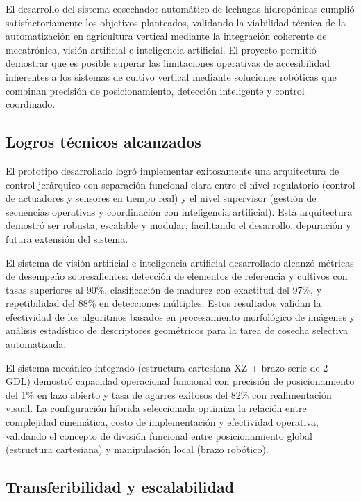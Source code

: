 El desarrollo del sistema cosechador automático de lechugas hidropónicas cumplió satisfactoriamente los objetivos planteados, validando la viabilidad técnica de la automatización en agricultura vertical mediante la integración coherente de mecatrónica, visión artificial e inteligencia artificial. El proyecto permitió demostrar que es posible superar las limitaciones operativas de accesibilidad inherentes a los sistemas de cultivo vertical mediante soluciones robóticas que combinan precisión de posicionamiento, detección inteligente y control coordinado.

\subsection*{Logros técnicos alcanzados}

El prototipo desarrollado logró implementar exitosamente una arquitectura de control jerárquico con separación funcional clara entre el nivel regulatorio (control de actuadores y sensores en tiempo real) y el nivel supervisor (gestión de secuencias operativas y coordinación con inteligencia artificial). Esta arquitectura demostró ser robusta, escalable y modular, facilitando el desarrollo, depuración y futura extensión del sistema.

El sistema de visión artificial e inteligencia artificial desarrollado alcanzó métricas de desempeño sobresalientes: detección de elementos de referencia y cultivos con tasas superiores al 90\%, clasificación de madurez con exactitud del 97\%, y repetibilidad del 88\% en detecciones múltiples. Estos resultados validan la efectividad de los algoritmos basados en procesamiento morfológico de imágenes y análisis estadístico de descriptores geométricos para la tarea de cosecha selectiva automatizada.

El sistema mecánico integrado (estructura cartesiana XZ + brazo serie de 2 GDL) demostró capacidad operacional funcional con precisión de posicionamiento del 1\% en lazo abierto y tasa de agarres exitosos del 82\% con realimentación visual. La configuración híbrida seleccionada optimiza la relación entre complejidad cinemática, costo de implementación y efectividad operativa, validando el concepto de división funcional entre posicionamiento global (estructura cartesiana) y manipulación local (brazo robótico).

\subsection*{Transferibilidad y escalabilidad}

